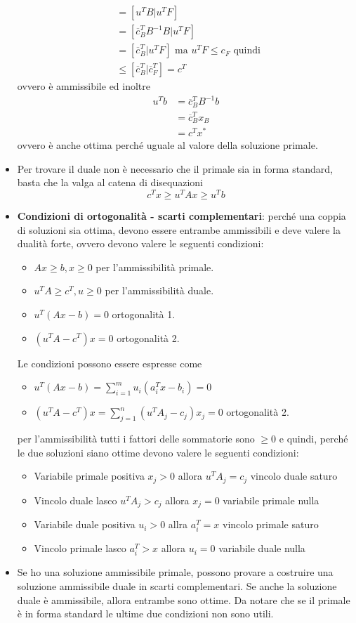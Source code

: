 \begin{itemize}
\begin{align*}
		      &= [u^TB | u^T F] \\
		      &= [\overline{c}_{B}^TB^{-1} B | u^T F] \\
		      &= [\overline{c}_{B}^T | u^T F] \text{ ma $u^T F \leq c_F$ quindi }\\
		      &\leq [\overline{c}_{B}^T | \overline{c}_{F}^T] = c^T
	\end{align*}
	ovvero è ammissibile ed inoltre
	\begin{align*}
		u^T b &= \overline{c}_{B}^TB^{-1}b \\
		      &= \overline{c}_{B}^T x_B \\
		      &= c^T x^*
	\end{align*}
	ovvero è anche ottima perché uguale al valore della soluzione primale.
	\item Per trovare il duale non è necessario che il primale sia in forma standard, basta che la valga al catena di disequazioni
	$$
	c^T x \geq u^T A x \geq u^T b
	$$
	\item \textbf{Condizioni di ortogonalità - scarti complementari}: perché una coppia di soluzioni sia ottima, devono essere entrambe ammissibili e deve valere la dualità forte, ovvero devono valere le seguenti condizioni:
	\begin{itemize}
		\item $Ax \geq b, x \geq 0$ per l'ammissibilità primale.
		\item $u^TA \geq c^T, u \geq 0$ per l'ammissibilità duale.
		\item $u^T(Ax-b) = 0$ ortogonalità 1.
		\item $(u^T A - c^T)x = 0$ ortogonalità 2.
	\end{itemize}
	Le condizioni possono essere espresse come
	\begin{itemize}
		\item $u^T(Ax-b) = \sum\limits_{i = 1}^m u_i (a_{i}^Tx - b_i) = 0$
		\item $(u^T A - c^T)x = \sum\limits_{j = 1 }^n (u^T A_{j} - c_{j})x_j = 0$ ortogonalità 2.
	\end{itemize}
	per l'ammissibilità tutti i fattori delle sommatorie sono $\geq 0$ e quindi, perché le due soluzioni siano ottime devono valere le seguenti condizioni:
	\begin{itemize}
		\item Variabile primale positiva $x_j > 0$ allora $u^TA_j = c_j$ vincolo duale saturo
		\item Vincolo duale lasco $u^TA_j > c_j$ allora $x_j = 0$ variabile primale nulla
		\item Variabile duale positiva $u_i > 0$ allra $a_{i}^T = x $ vincolo primale saturo 
		\item Vincolo primale lasco $a_{i}^T > x$ allora $u_i = 0$ variabile duale nulla
	\end{itemize}
	\item Se ho una soluzione ammissibile primale, possono provare a costruire una soluzione ammissibile duale in scarti complementari. Se anche la soluzione duale è ammissibile, allora entrambe sono ottime. Da notare che se il primale è in forma standard le ultime due condizioni non sono utili.
\end{itemize}

